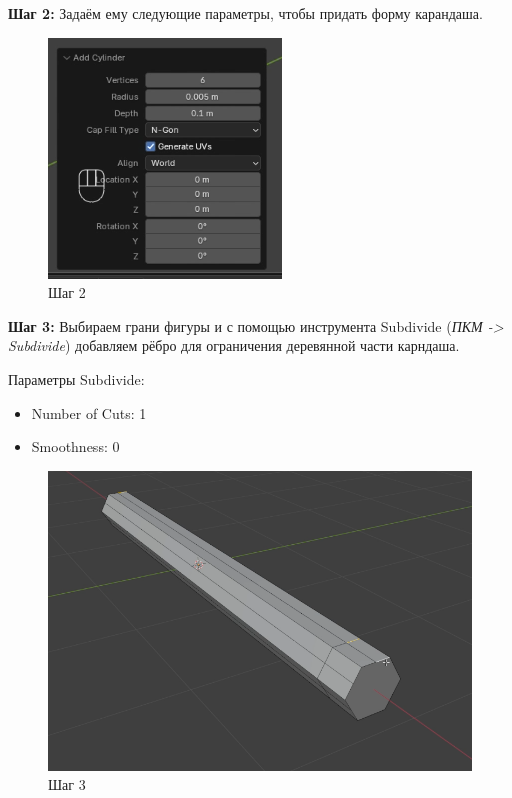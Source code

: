 \documentclass[areasetadvanced]{scrartcl}
\begin{document}
\par \textbf{Шаг 2:} Задаём ему следующие параметры, чтобы придать форму карандаша.
\begin{figure}[H]
    \label{4} 
    \centering
    \includegraphics[width=0.5\linewidth]{pen/2.png}
    \caption{Шаг 2}
\end{figure}


\par \textbf{Шаг 3:} Выбираем грани фигуры и с помощью инструмента Subdivide (\textit{ПКМ -> Subdivide}) добавляем рёбро для ограничения деревянной части карндаша.
\par Параметры Subdivide:
\begin{itemize}
    \item Number of Cuts: 1
    \item Smoothness: 0
\end{itemize}

\begin{figure}[H]
    \label{4} 
    \centering
    \includegraphics[width=0.6\linewidth]{pen/3.png}
    \caption{Шаг 3}
\end{figure}
\end{document}
